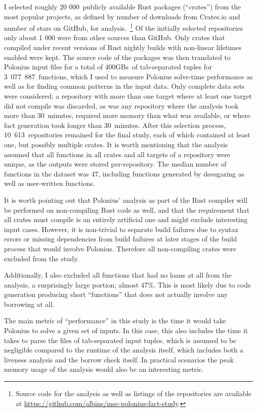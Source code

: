 \documentclass[11pt,a4paper,twoside,openany]{report}
\begin{document}
I selected roughly 20 000~publicly available Rust packages (``crates'') from the
most popular projects, as defined by number of downloads from Crates.io and
number of stars on GitHub, for analysis.~\footnote{Source code for the analysis
  as well as listings of the repositories are available at
  \url{https://github.com/albins/msc-polonius-fact-study}.} Of the initially
selected repositories only about 1 000 were from other sources than GitHub. Only
crates that compiled under recent versions of Rust nightly builds with
non-linear lifetimes enabled were kept. The source code of the packages was then
translated to Polonius input files for a total of 400GBs~of tab-separated tuples
for 3~077~887~functions, which I used to measure Polonius solve-time performance
as well as for finding common patterns in the input data. Only complete data
sets were considered; a repository with more than one target where at least one
target did not compile was discarded, as was any repository where the analysis
took more than 30~minutes, required more memory than what was available, or
where fact generation took longer than $30$~minutes. After this selection
process, 10~613~repositories remained for the final study, each of which
contained at least one, but possibly multiple crates. It is worth mentioning
that the analysis assumed that all functions in all crates and all targets of a
repository were unique, as the outputs were stored per-repository. The median
number of functions in the dataset was 47, including functions generated by
desugaring as well as user-written functions.

It is worth pointing out that Polonius' analysis as part of the Rust compiler
will be performed on non-compiling Rust code as well, and that the requirement
that all crates must compile is an entirely artificial one and might exclude
interesting input cases. However, it is non-trivial to separate build failures
due to syntax errors or missing dependencies from build failures at later stages
of the build process that would involve Polonius. Therefore all non-compiling
crates were excluded from the study.

Additionally, I also excluded all functions that had no loans at all from the
analysis, a surprisingly large portion; almost 47\%. This is most likely due to
code generation producing short ``functions'' that does not actually involve any
borrowing at all.

The main metric of ``performance'' in this study is the time it would take
Polonius to solve a given set of inputs. In this case, this also includes the
time it takes to parse the files of tab-separated input tuples, which is assumed
to be negligible compared to the runtime of the analysis itself, which includes
both a liveness analysis and the borrow check itself. In practical scenarios the
peak memory usage of the analysis would also be an interesting metric.
\end{document}
